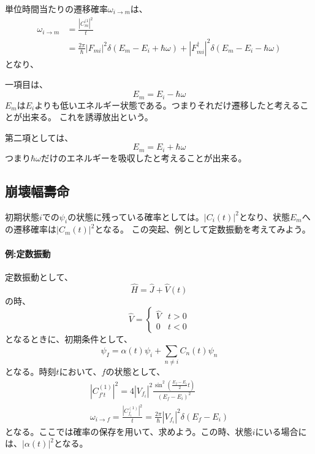 \documentclass[titlepage]{ltjsarticle}
\begin{document}
単位時間当たりの遷移確率\(\omega_{i\to m}\)は、
\begin{align}
  \omega_{i \to m} & = \frac{|C_m^{(1}|^2}{t}\\
  & = \frac{2\pi}{\hbar} |F_{mi}|^2 \delta(E_m - E_i + \hbar \omega) + |F^\dagger_{mi}|^2 \delta(E_m - E_i - \hbar \omega) 
\end{align}
となり、


一項目は、
\begin{equation}
  E_m = E_i - \hbar\omega
\end{equation}
\(E_m\)は\(E_i\)よりも低いエネルギー状態である。つまりそれだけ遷移したと考えることが出来る。
これを誘導放出という。


第二項としては、
\begin{equation}
  E_m = E_i + \hbar \omega
\end{equation}
つまり\(\hbar\omega\)だけのエネルギーを吸収したと考えることが出来る。



\subsection{崩壊幅壽命}

初期状態\(i\)での\(\psi_i\)の状態に残っている確率としては。\(|C_i(t)|^2\)となり、状態\(E_m\)への遷移確率は\(|C_m(t)|^2\)となる。
この突起、例として定数振動を考えてみよう。

\paragraph{例:定数振動}
定数振動として、
\begin{equation}
  \hat{H} = \hat{J} + \hat{V}(t)
\end{equation}
の時、
\begin{equation}
  \hat{V} = \begin{cases}
    \hat{V} & t>0 \\
    0 & t<0
  \end{cases}
\end{equation}
となるときに、初期条件として、
\begin{equation}
  \psi_I = \alpha(t) \psi_i + \sum_{n\ne i} C_n (t) \psi_n 
\end{equation}
となる。時刻\(t\)において、\(f\)の状態として、
\begin{align}
  |C^{(1)}_{f't}|^2= 4|V_{f_i}|^2 \frac{\sin^2\left( \frac{E_f-E_i}{2}t \right)}{(E_f-E_i)^2}\\
  \omega_{i \to f} = \frac{|C_{f_i}^{(1)}|^2}{t} = \frac{2\pi}{\hbar}|V_{f_i}|^2 \delta(E_f - E_i)
\end{align}
となる。ここでは確率の保存を用いて、求めよう。この時、状態\(i\)にいる場合には、\(|\alpha(t)|^2\)となる。
\end{document}
